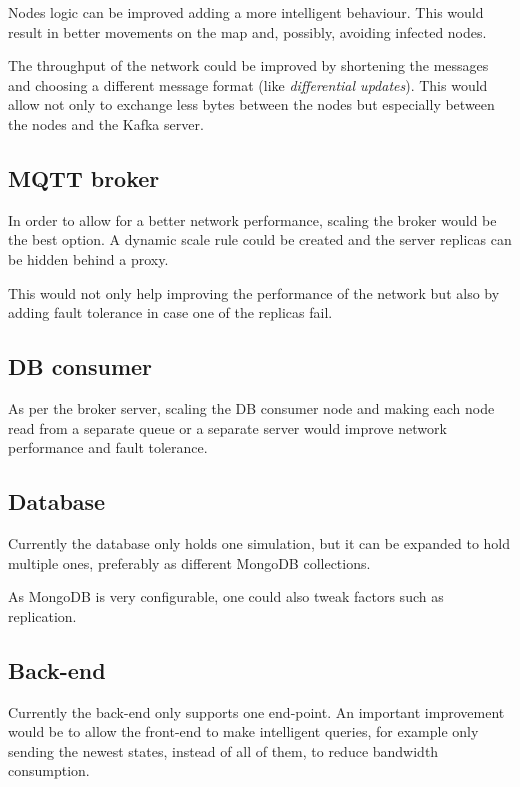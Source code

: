 \documentclass[conference]{IEEEtran}
\begin{document}
		Nodes logic can be improved adding a more intelligent behaviour.
		This would result in better movements on the map and, possibly, avoiding infected nodes.
		
		The throughput of the network could be improved by shortening the messages and choosing a different message format (like \textit{differential updates}).
		This would allow not only to exchange less bytes between the nodes but especially between the nodes and the Kafka server.
	
	\subsection{MQTT broker}
		
		In order to allow for a better network performance, scaling the broker would be the best option.
		A dynamic scale rule could be created and the server replicas can be hidden behind a proxy.
		
		This would not only help improving the performance of the network but also by adding fault tolerance in case one of the replicas fail.
		
	\subsection{DB consumer}
		
		As per the broker server, scaling the DB consumer node and making each node read from a separate queue or a separate server would improve network performance and fault tolerance.
	
	\subsection{Database}
	
		Currently the database only holds one simulation, but it can be expanded to hold multiple ones, preferably as different MongoDB collections.
		
		As MongoDB is very configurable, one could also tweak factors such as replication.
	
	\subsection{Back-end}
		
		Currently the back-end only supports one end-point. 
		An important improvement would be to allow the front-end to make intelligent queries, for example only sending the newest states, instead of all of them, to reduce bandwidth consumption. 
		
\end{document}
